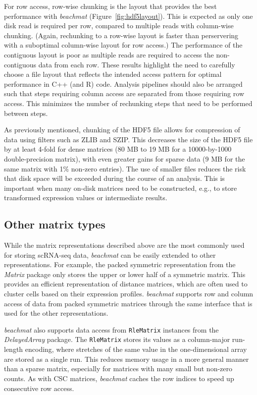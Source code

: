 \documentclass[10pt,letterpaper]{article}
\newcommand{\beachmat}{\textit{beachmat}}
\newcommand{\code}[1]{\texttt{#1}}
\begin{document}
For row access, row-wise chunking is the layout that provides the best performance with \beachmat{} (Figure~\ref{fig:hdf5layout}).
This is expected as only one disk read is required per row, compared to multiple reads with column-wise chunking.
(Again, rechunking to a row-wise layout is faster than perservering with a suboptimal column-wise layout for row access.)
The performance of the contiguous layout is poor as multiple reads are required to access the non-contiguous data from each row.
These results highlight the need to carefully choose a file layout that reflects the intended access pattern for optimal performance in C++ (and R) code.
Analysis pipelines should also be arranged such that steps requiring column access are separated from those requiring row access.
This minimizes the number of rechunking steps that need to be performed between steps.

As previously mentioned, chunking of the HDF5 file allows for compression of data using filters such as ZLIB and SZIP.
This decreases the size of the HDF5 file by at least 4-fold for dense matrices (80 MB to 19 MB for a 10000-by-1000 double-precision matrix), with even greater gains for sparse data (9 MB for the same matrix with 1\% non-zero entries).
The use of smaller files reduces the risk that disk space will be exceeded during the course of an analysis.
This is important when many on-disk matrices need to be constructed, e.g., to store transformed expression values or intermediate results.

\subsection*{Other matrix types}
While the matrix representations described above are the most commonly used for storing scRNA-seq data, \beachmat{} can be easily extended to other representations.
For example, the packed symmetric representation from the \textit{Matrix} package only stores the upper or lower half of a symmetric matrix.
This provides an efficient representation of distance matrices, which are often used to cluster cells based on their expression profiles.
\beachmat{} supports row and column access of data from packed symmetric matrices through the same interface that is used for the other representations.

\beachmat{} also supports data access from \code{RleMatrix} instances from the \textit{DelayedArray} package.
The \code{RleMatrix} stores its values as a column-major run-length encoding, where stretches of the same value in the one-dimensional array are stored as a single run.
This reduces memory usage in a more general manner than a sparse matrix, especially for matrices with many small but non-zero counts.
As with CSC matrices, \beachmat{} caches the row indices to speed up consecutive row access.
\end{document}
